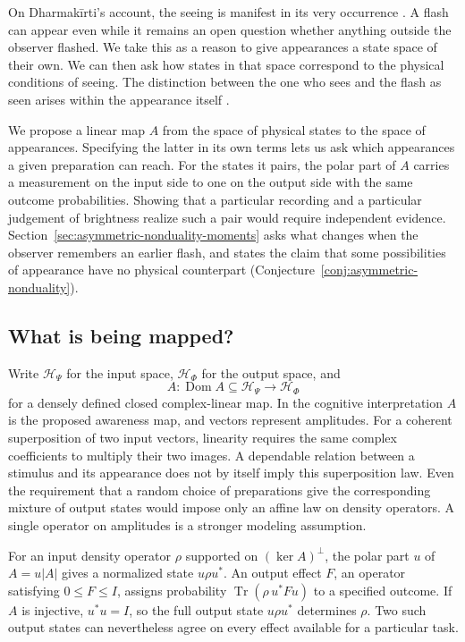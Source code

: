\documentclass[11pt]{article}
\theoremstyle{definition}
\DeclareMathOperator{\Tr}{Tr}
\begin{document}
On Dharmak\=irti's account, the seeing is manifest in its very occurrence \cite[p.~31]{Yiannopoulos2020}. A flash can appear even while it remains an open question whether anything outside the observer flashed. We take this as a reason to give appearances a state space of their own. We can then ask how states in that space correspond to the physical conditions of seeing. The distinction between the one who sees and the flash as seen arises within the appearance itself \cite[pp.~27--28, 40--41]{Yiannopoulos2020}.

We propose a linear map $A$ from the space of physical states to the space of appearances. Specifying the latter in its own terms lets us ask which appearances a given preparation can reach. For the states it pairs, the polar part of $A$ carries a measurement on the input side to one on the output side with the same outcome probabilities. Showing that a particular recording and a particular judgement of brightness realize such a pair would require independent evidence. Section~\ref{sec:asymmetric-nonduality-moments} asks what changes when the observer remembers an earlier flash, and states the claim that some possibilities of appearance have no physical counterpart (Conjecture~\ref{conj:asymmetric-nonduality}).

\subsection*{What is being mapped?}
Write $\mathcal H_\Psi$ for the input space, $\mathcal H_\Phi$ for the output space, and
\[
 A:\operatorname{Dom}A\subseteq\mathcal H_\Psi\longrightarrow\mathcal H_\Phi
\]
for a densely defined closed complex-linear map. In the cognitive interpretation $A$ is the proposed awareness map, and vectors represent amplitudes. For a coherent superposition of two input vectors, linearity requires the same complex coefficients to multiply their two images. A dependable relation between a stimulus and its appearance does not by itself imply this superposition law. Even the requirement that a random choice of preparations give the corresponding mixture of output states would impose only an affine law on density operators. A single operator on amplitudes is a stronger modeling assumption.

For an input density operator $\rho$ supported on $(\ker A)^\perp$, the polar part $u$ of $A=u|A|$ gives a normalized state $u\rho u^*$. An output effect $F$, an operator satisfying $0\leq F\leq I$, assigns probability $\Tr(\rho\,u^*Fu)$ to a specified outcome. If $A$ is injective, $u^*u=I$, so the full output state $u\rho u^*$ determines $\rho$. Two such output states can nevertheless agree on every effect available for a particular task.
\end{document}
